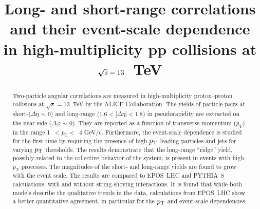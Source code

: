 \documentclass[ALICE,manyauthors]{cernphprep}
\begin{document}
\begin{titlepage}

\PHyear{}
\PHdate{\today}
%

\title{Long- and short-range correlations and their event-scale dependence in high-multiplicity pp collisions at $\boldsymbol{\sqrt{{\textit s}}}=13$~TeV}


\begin{abstract}
%
Two-particle angular correlations are measured in high-multiplicity proton--proton collisions at $\sqrt{s} =13$~TeV by the ALICE Collaboration. The yields of particle pairs at short-($\Delta\eta$ $\sim$ 0) and long-range ($1.6 < |\Delta\eta| < 1.8$) in pseudorapidity are extracted on the near-side ($\Delta\varphi$ $\sim$ 0).
They are reported as a function of transverse momentum ($p_{\mathrm T}$) in the range 1~$<p_{\mathrm T}<$~4 GeV/$c$.
Furthermore, the event-scale dependence is studied for the first time by requiring the presence of high-$p_{\rm T}$ leading particles and jets for varying $p_{\rm T}$ thresholds. 
The results demonstrate that the long-range ``ridge'' yield, possibly related to the collective behavior of the system, is present in events with high-$p_{\mathrm T}$ processes. The magnitudes of the short- and long-range yields are found to grow with the event scale. 
The results are compared to EPOS~LHC and PYTHIA~8 calculations, with and without string-shoving interactions. It is found that while both models describe the qualitative trends in the data, calculations from EPOS~LHC show a better quantitative agreement, in particular for the $p_{\rm T}$ and event-scale dependencies.


\end{abstract}
\end{titlepage}
\end{document}
